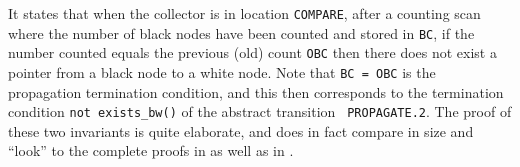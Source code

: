 \noindent
It states that when the collector is in  location {\tt COMPARE}, after
a counting scan where the number of black  nodes have been counted and
stored in {\tt  BC}, if the number counted  equals the  previous (old)
count {\tt OBC} then there does not exist a pointer  from a black node
to a   white  node.  Note that   {\tt  BC =   OBC} is  the propagation
termination condition,  and this  then corresponds to  the termination
condition {\tt  not   exists\_bw()} of the  abstract  transition  {\tt
  PROPAGATE.2}.  The  proof  of    these  two invariants   is  quite
elaborate,   and does in  fact  compare  in  size  and ``look'' to the
complete  proofs in \cite{havelund-pvs-gc-99}  as well as in \cite{Rus:GC}\@. 

